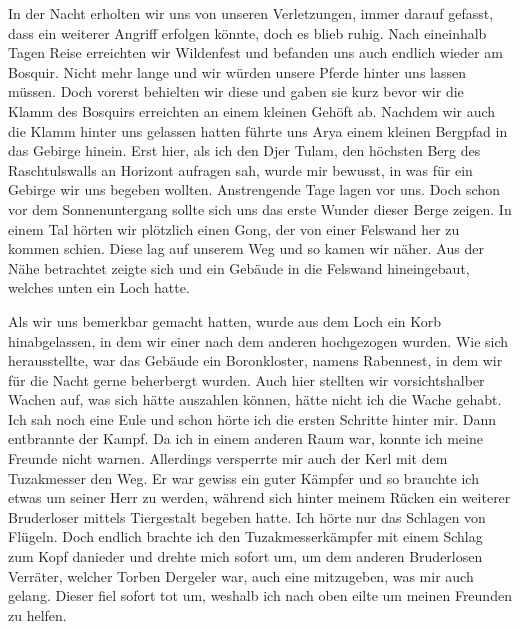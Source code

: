 In der Nacht erholten wir uns von unseren Verletzungen, immer darauf gefasst, dass ein weiterer Angriff erfolgen könnte, doch es blieb ruhig. Nach eineinhalb Tagen Reise erreichten wir Wildenfest und befanden uns auch endlich wieder am Bosquir. Nicht mehr lange und wir würden unsere Pferde hinter uns lassen müssen. Doch vorerst behielten wir diese und gaben sie kurz bevor wir die Klamm des Bosquirs erreichten an einem kleinen Gehöft ab. Nachdem wir auch die Klamm hinter uns gelassen hatten führte uns Arya einem kleinen Bergpfad in das Gebirge hinein. Erst hier, als ich den Djer Tulam, den höchsten Berg des Raschtulswalls an Horizont aufragen sah, wurde mir bewusst, in was für ein Gebirge wir uns begeben wollten. Anstrengende Tage lagen vor uns. Doch schon vor dem Sonnenuntergang sollte sich uns das erste Wunder dieser Berge zeigen. In einem Tal hörten wir plötzlich einen Gong, der von einer Felswand her zu kommen schien. Diese lag auf unserem Weg und so kamen wir näher. Aus der Nähe betrachtet zeigte sich und ein Gebäude in die Felswand hineingebaut, welches unten ein Loch hatte. 

Als wir uns bemerkbar gemacht hatten, wurde aus dem Loch ein Korb hinabgelassen, in dem wir einer nach dem anderen hochgezogen wurden. Wie sich herausstellte, war das Gebäude ein Boronkloster, namens Rabennest, in dem wir für die Nacht gerne beherbergt wurden. Auch hier stellten wir vorsichtshalber Wachen auf, was sich hätte auszahlen können, hätte nicht ich die Wache gehabt. Ich sah noch eine Eule und schon hörte ich die ersten Schritte hinter mir. Dann entbrannte der Kampf. Da ich in einem anderen Raum war, konnte ich meine Freunde nicht warnen. Allerdings versperrte mir auch der Kerl mit dem Tuzakmesser den Weg. Er war gewiss ein guter Kämpfer und so brauchte ich etwas um seiner Herr zu werden, während sich hinter meinem Rücken ein weiterer Bruderloser mittels Tiergestalt begeben hatte. Ich hörte nur das Schlagen von Flügeln. Doch endlich brachte ich den Tuzakmesserkämpfer mit einem Schlag zum Kopf danieder und drehte mich sofort um, um dem anderen Bruderlosen Verräter, welcher Torben Dergeler war, auch eine mitzugeben, was mir auch gelang. Dieser fiel sofort tot um, weshalb ich nach oben eilte um meinen Freunden zu helfen. 

